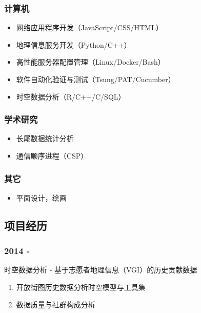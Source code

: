 \documentclass[12pt,]{article}
\providecommand{\tightlist}{%
  \setlength{\itemsep}{0pt}\setlength{\parskip}{0pt}}
\begin{document}
\subsubsection{计算机}\label{ux8ba1ux7b97ux673a}

\begin{itemize}
\tightlist
\item
  网络应用程序开发（JavaScript/CSS/HTML）
\item
  地理信息服务开发（Python/C++）
\item
  高性能服务器配置管理（Linux/Docker/Bash）
\item
  软件自动化验证与测试（Tsung/PAT/Cucumber）
\item
  时空数据分析（R/C++/C/SQL）
\end{itemize}

\subsubsection{学术研究}\label{ux5b66ux672fux7814ux7a76}

\begin{itemize}
\tightlist
\item
  长尾数据统计分析
\item
  通信顺序进程（CSP）
\end{itemize}

\subsubsection{其它}\label{ux5176ux5b83}

\begin{itemize}
\tightlist
\item
  平面设计，绘画
\end{itemize}

\subsection{项目经历}\label{ux9879ux76eeux7ecfux5386}

\subsubsection{2014 -}\label{section-3}

时空数据分析 - 基于志愿者地理信息（VGI）的历史贡献数据

\begin{enumerate}
\tightlist
\item
  开放街图历史数据分析时空模型与工具集
\item
  数据质量与社群构成分析
\end{enumerate}
\end{document}
